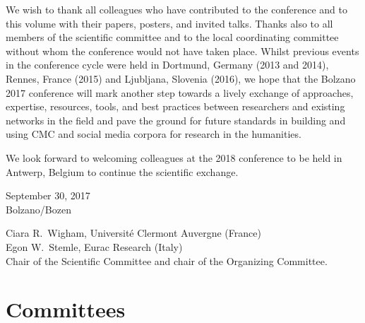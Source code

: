 We wish to thank all colleagues who have contributed to the conference and to this volume with their papers, posters, and invited talks. Thanks also to all members of the scientific committee and to the local coordinating committee without whom the conference would not have taken place. Whilst previous events in the conference cycle were held in Dortmund, Germany (2013 and 2014), Rennes, France (2015) and Ljubljana, Slovenia (2016), we hope that the Bolzano 2017 conference will mark another step towards a lively exchange of approaches, expertise, resources, tools, and best practices between researchers and existing networks in the field and pave the ground for future standards in building and using CMC and social media corpora for research in the humanities.

We look forward to welcoming colleagues at the 2018 conference to be held in Antwerp, Belgium to continue the scientific exchange.
\bigskip

\noindent
\begin{minipage}[t]{.18\textwidth}%
    September 30, 2017\\
    Bolzano/Bozen
\end{minipage}%
\hfill
\begin{minipage}[t]{.80\textwidth}\flushright%
    Ciara R.~Wigham, Universit\'e Clermont Auvergne (France)  \\%
    Egon W.~Stemle, Eurac Research (Italy)  \\%
    \medskip
    Chair of the Scientific Committee and chair of the Organizing Committee.
\end{minipage}
\thispagestyle{scrplain}
\clearpage


\renewcommand\contentsname{Table of Contents}
{}
\tableofcontents
\clearpage


\chapter*{Committees}
{}%

\bigskip
